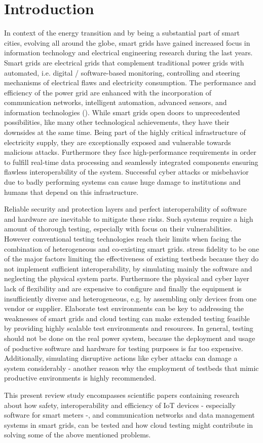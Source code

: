 \section{Introduction}
In context of the energy transition and by being a substantial part of smart cities, evolving all around the globe, smart grids have gained increased focus in information technology and electrical engineering research during the last years. Smart grids are electrical grids that complement traditional power grids with automated, i.e. digital / software-based monitoring, controlling and steering mechanisms of electrical flaws and electricity consumption. The performance and efficiency of the power grid are enhanced with the incorporation of communication networks, intelligent automation, advanced sensors, and information technologies (\citeauthor{smadi2021comprehensive}). While smart grids open doors to unprecedented possibilities, like many other technological achievements, they have their downsides at the same time. Being part of the highly critical infrastructure of electricity supply, they are exceptionally exposed and vulnerable towards malicious attacks. Furthermore they face high-performance requirements in order to fulfill real-time data processing and seamlessly integrated components ensuring flawless interoperability of the system. Successful cyber attacks or misbehavior due to badly performing systems can cause huge damage to institutions and humans that depend on this infrastructure.

Reliable security and protection layers and perfect interoperability of software and hardware are inevitable to mitigate these risks. Such systems require a high amount of thorough testing, especially with focus on their vulnerabilities. However conventional testing technologies reach their limits when facing the combination of heterogeneous and co-existing smart grids. \citeauthor{smadi2021comprehensive} stress fidelity to be one of the major factors limiting the effectiveness of existing testbeds because they do not implement sufficient interoperability, by simulating mainly the software and neglecting the physical system parts. Furthermore the physical and cyber layer lack of flexibility and are expensive to configure and finally the equipment is insufficiently diverse and heterogeneous, e.g. by assembling only devices from one vendor or supplier. Elaborate test environments can be key to addressing the weaknesses of smart grids and cloud testing can make extended testing feasible by providing highly scalable test environments and resources. In general, testing should not be done on the real power system, because the deployment and usage of poductive software and hardware for testing purposes is far too expensive. Additionally, simulating disruptive actions like cyber attacks can damage a system considerably - another reason why the employment of testbeds that mimic productive environments is highly recommended.

This present review study encompasses scientific papers containing research about how safety, interoperability and efficiency of IoT devices - especially software for smart meters -, and communication networks and data management systems in smart grids, can be tested and how cloud testing might contribute in solving some of the above mentioned problems.
